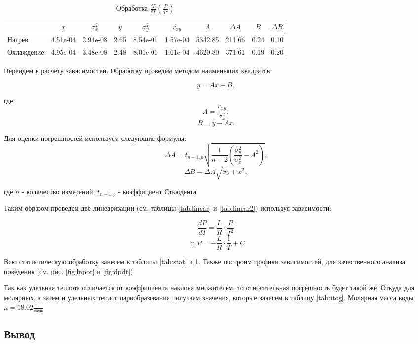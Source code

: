 \documentclass[12pt,a4paper]{article}
\begin{document}
\begin{table}
	\caption{Обработка $\frac{dP}{dT}(\frac{P}{T^2})$}
	\label{tab:dpstat}
	\centering
	\footnotesize
	\begin{tabular}{l|ccccccccc}
		\toprule
		$ $ & $\overline{x}$ & $\sigma_x^2$ & $\overline{y}$ & $\sigma_y^2$ & $r_{xy}$ & $A$ & $\Delta A$ & $B$ & $\Delta B$ \\ \midrule
		Нагрев & 4.51e-04 & 2.94e-08 & 2.65 & 8.54e-01 & 1.57e-04 & 5342.85 & 211.66 & 0.24 & 0.10 \\ 
		Охлаждение & 4.95e-04 & 3.48e-08 & 2.48 & 8.01e-01 & 1.61e-04 & 4620.80 & 371.61 & 0.19 & 0.20 \\ \bottomrule
	\end{tabular}
\end{table}


Перейдем к расчету зависимостей. Обработку проведем методом наименьших квадратов:

$$y = Ax + B,$$

где $$A = \frac{r_{xy}}{ \sigma_x^2},$$
$$B = \overline{y} - A\overline{x}.$$

Для оценки погрешностей используем следующие формулы:
$$\Delta A =  t_{n-1, p} \sqrt{\frac{1}{n-2} \left( \frac{\sigma_y^2}{\sigma_x^2} - A^2 \right)},$$
$$\Delta B = \Delta A \sqrt{\sigma_x^2 + \overline{x}^2},$$

где 
$n$ - количество измерений, $ t_{n-1, p}$ - коэффициент Стьюдента

Таким образом проведем две линеаризации (см. таблицы \ref{tab:linear} и \ref{tab:linear2}) используя зависимости:

$$\frac{dP}{dT} = \frac{L}{R} \cdot \frac{P}{T^2}$$
$$\ln{P} = -\frac{L}{R} \cdot \frac{1}{T} + C$$

Всю статистическую обработку занесем в таблицы \ref{tab:stat} и \ref{tab:dpstat}. Также построим графики зависимостей, для качественного анализа поведения (см. рис. \ref{fig:lnpot} и \ref{fig:dpdt})

Так как удельная теплота отличается от коэффициента наклона множителем, то относительная погрешность будет такой же. Откуда для молярных, а затем и удельных теплот парообразования получаем значения, которые занесем в таблицу \ref{tab:itog}. Молярная масса воды $\mu = 18.02 \frac{\text{г}}{\text{моль}}$



\subsection*{Вывод}
\end{document}
